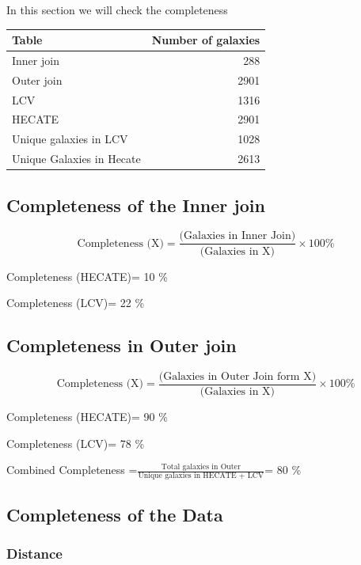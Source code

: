 \documentclass[
]{article}
\begin{document}
In this section we will check the completeness

\begin{longtable}[]{@{}lr@{}}
\toprule\noalign{}
Table & Number of galaxies \\
\midrule\noalign{}
\endhead
\bottomrule\noalign{}
\endlastfoot
Inner join & 288 \\
Outer join & 2901 \\
LCV & 1316 \\
HECATE & 2901 \\
Unique galaxies in LCV & 1028 \\
Unique Galaxies in Hecate & 2613 \\
\end{longtable}

\subsection{Completeness of the Inner
join}\label{completeness-of-the-inner-join}

\[
\text{Completeness (X)}=\frac{\text{(Galaxies in Inner Join)}}{\text{(Galaxies in X)}}×100\%
\]

Completeness (HECATE)= 10 \%

Completeness (LCV)= 22 \%

\subsection{Completeness in Outer
join}\label{completeness-in-outer-join}

\[
\text{Completeness (X)}=\frac{\text{(Galaxies in Outer Join form X)}}{\text{(Galaxies in X)}}×100\%
\]

Completeness (HECATE)= 90 \%

Completeness (LCV)= 78 \%

Combined Completeness
=\(\frac{\text{Total galaxies in Outer}}{\text{Unique galaxies in HECATE + LCV}}\)=
80 \%

\subsection{Completeness of the Data}\label{completeness-of-the-data}

\subsubsection{Distance}\label{distance}
\end{document}
